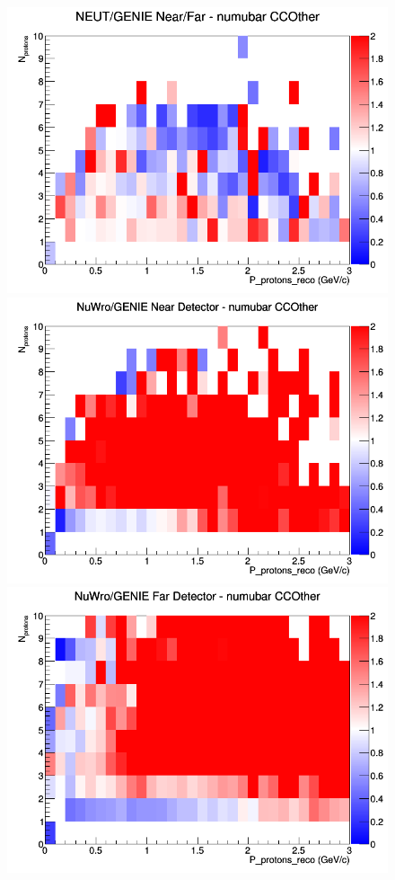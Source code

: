 \begin{figure}[h]
\endminipage
{}
\includegraphics[width=\linewidth]{eff_N_P/FGT/protons/ratios/CCOther_NEUT_GENIE_numubar_NF_N_P.png}
\endminipage
\newline
{}
\includegraphics[width=\linewidth]{eff_N_P/FGT/protons/ratios/CCOther_NuWro_GENIE_numubar_near_N_P.png}
\endminipage
{}
\includegraphics[width=\linewidth]{eff_N_P/FGT/protons/ratios/CCOther_NuWro_GENIE_numubar_far_N_P.png}

\end{figure}
